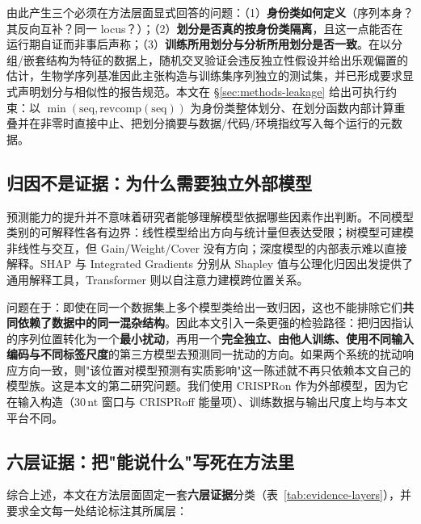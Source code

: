 由此产生三个必须在方法层面显式回答的问题：（1）\textbf{身份类如何定义}（序列本身？其反向互补？同一 locus？）；（2）\textbf{划分是否真的按身份类隔离}，且这一点能否在运行期自证而非事后声称；（3）\textbf{训练所用划分与分析所用划分是否一致}。在以分组/嵌套结构为特征的数据上，随机交叉验证会违反独立性假设并给出乐观偏置的估计\citep{Roberts2017Ecography}，生物学序列基准因此主张构造与训练集序列独立的测试集\citep{Petti2022PLOSCB}，并已形成要求显式声明划分与相似性的报告规范\citep{Walsh2021NatMethods}。本文在 \S\ref{sec:methods-leakage} 给出可执行约束：以 $\min(\text{seq},\text{revcomp}(\text{seq}))$ 为身份类整体划分、在划分函数内部计算重叠并在非零时直接中止、把划分摘要与数据/代码/环境指纹写入每个运行的元数据。

\subsection{归因不是证据：为什么需要独立外部模型}

预测能力的提升并不意味着研究者能够理解模型依据哪些因素作出判断。不同模型类别的可解释性各有边界：线性模型给出方向与统计量但表达受限；树模型可建模非线性与交互\citep{Chen2016KDD}，但 Gain/Weight/Cover 没有方向；深度模型的内部表示难以直接解释。SHAP 与 Integrated Gradients 分别从 Shapley 值与公理化归因出发提供了通用解释工具\citep{Lundberg2017NeurIPS,Sundararajan2017ICML}，Transformer 则以自注意力建模跨位置关系\citep{Vaswani2017NeurIPS}。

问题在于：即使在同一个数据集上多个模型类给出一致归因，这也不能排除它们\textbf{共同依赖了数据中的同一混杂结构}\citep{Novakovsky2023NatRevGenet}。因此本文引入一条更强的检验路径：把归因指认的序列位置转化为一个\textbf{最小扰动}，再用一个\textbf{完全独立、由他人训练、使用不同输入编码与不同标签尺度}的第三方模型去预测同一扰动的方向。如果两个系统的扰动响应方向一致，则"该位置对模型预测有实质影响"这一陈述就不再只依赖本文自己的模型族。这是本文的第二研究问题。我们使用 CRISPRon 作为外部模型\citep{Xiang2021NatCommun}，因为它在输入构造（30\,nt 窗口与 CRISPRoff 能量项）、训练数据与输出尺度上均与本文平台不同。

\subsection{六层证据：把"能说什么"写死在方法里}

综合上述，本文在方法层面固定一套\textbf{六层证据}分类（表~\ref{tab:evidence-layers}），并要求全文每一处结论标注其所属层：

